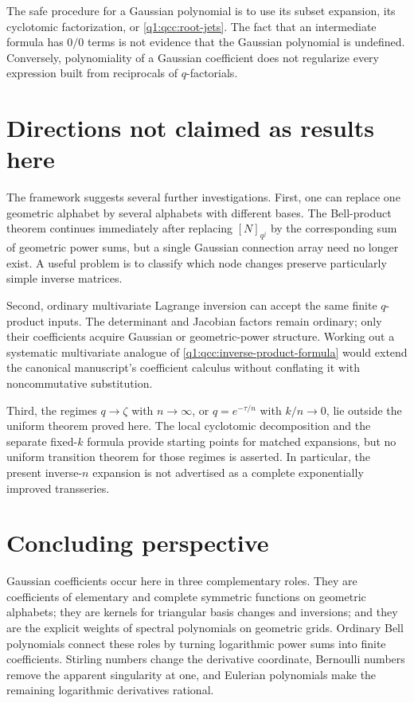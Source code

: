 \documentclass[11pt,a4paper,oneside,openany]{book}
\theoremstyle{definition}
\theoremstyle{remark}
\begin{document}
The safe procedure for a Gaussian polynomial is to use its subset expansion,
its cyclotomic factorization, or \cref{q1:qcc:root-jets}. The fact that an intermediate
formula has $0/0$ terms is not evidence that the Gaussian polynomial is undefined.
Conversely, polynomiality of a Gaussian coefficient does not regularize every
expression built from reciprocals of $q$-factorials.
\section{Directions not claimed as results here}
The framework suggests several further investigations. First, one can
replace one geometric alphabet by several alphabets with different bases.
The Bell-product theorem continues immediately after replacing
$[N]_{q^j}$ by the corresponding sum of geometric power sums, but a
single Gaussian connection array need no longer exist. A useful problem
is to classify which node changes preserve particularly simple inverse
matrices.

Second, ordinary multivariate Lagrange inversion can accept the same
finite $q$-product inputs. The determinant and Jacobian factors remain
ordinary; only their coefficients acquire Gaussian or geometric-power
structure. Working out a systematic multivariate analogue of
\cref{q1:qcc:inverse-product-formula} would extend the canonical manuscript's coefficient
calculus without conflating it with noncommutative substitution.

Third, the regimes $q\to\zeta$ with $n\to\infty$, or
$q=e^{-\tau/n}$ with $k/n\to0$, lie outside the uniform theorem proved
here. The local cyclotomic decomposition and the separate fixed-$k$
formula provide starting points for matched expansions, but no uniform
transition theorem for those regimes is asserted. In particular, the
present inverse-$n$ expansion is not advertised as a complete
exponentially improved transseries.
\section{Concluding perspective}
Gaussian coefficients occur here in three complementary roles. They are
coefficients of elementary and complete symmetric functions on geometric
alphabets; they are kernels for triangular basis changes and inversions; and
they are the explicit weights of spectral polynomials on geometric grids.
Ordinary Bell polynomials connect these roles by turning logarithmic power sums
into finite coefficients. Stirling numbers change the derivative coordinate,
Bernoulli numbers remove the apparent singularity at one, and Eulerian
polynomials make the remaining logarithmic derivatives rational.
\end{document}

